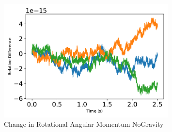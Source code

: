\begin{figure}[htbp]\centerline{\includegraphics[width=0.8\textwidth]{AutoTeX/ChangeInRotationalAngularMomentumNoGravity}}\caption{Change in Rotational Angular Momentum NoGravity}\label{fig:ChangeInRotationalAngularMomentumNoGravity}\end{figure}
